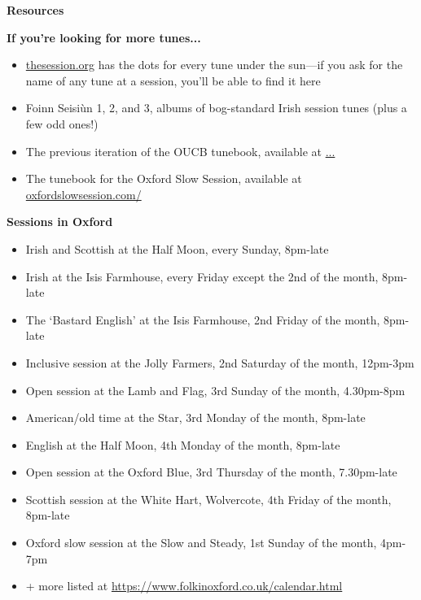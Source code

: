 \documentclass[11pt]{article}
\begin{document}
\centerline{\Large\textbf{Resources}}
\textbf{If you're looking for more tunes...}
\begin{itemize}
    \item \url{thesession.org} has the dots for every tune under the sun---if you ask for the name of any tune at a session, you'll be able to find it here
    \item Foinn Seisi\`un 1, 2, and 3, albums of bog-standard Irish session tunes (plus a few odd ones!)
    \item The previous iteration of the OUCB tunebook, available at \url{...}
    \item The tunebook for the Oxford Slow Session, available at \url{oxfordslowsession.com/}
\end{itemize}

\textbf{Sessions in Oxford}
\begin{itemize}
    \item Irish and Scottish at the Half Moon, every Sunday, 8pm-late
    \item Irish at the Isis Farmhouse, every Friday except the 2nd of the month, 8pm-late
    \item The `Bastard English' at the Isis Farmhouse, 2nd Friday of the month, 8pm-late
    \item Inclusive session at the Jolly Farmers, 2nd Saturday of the month, 12pm-3pm
    \item Open session at the Lamb and Flag, 3rd Sunday of the month, 4.30pm-8pm
    \item American/old time at the Star, 3rd Monday of the month, 8pm-late
    \item English at the Half Moon, 4th Monday of the month, 8pm-late
    \item Open session at the Oxford Blue, 3rd Thursday of the month, 7.30pm-late
    \item Scottish session at the White Hart, Wolvercote, 4th Friday of the month, 8pm-late
    \item Oxford slow session at the Slow and Steady, 1st Sunday of the month, 4pm-7pm
    \item + more listed at \url{https://www.folkinoxford.co.uk/calendar.html}
\end{itemize}

\clearpage

\end{document}
